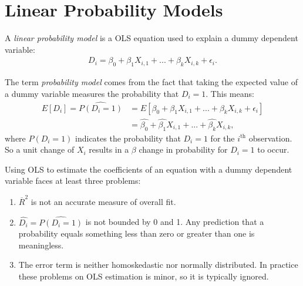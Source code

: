 \documentclass[11pt,twoside,openany]{memoir}
\begin{document}
        \begin{example}
            
        \end{example}
    \section*{Linear Probability Models}
        \begin{definition}
            A \textit{linear probability model} is a OLS equation used to explain a dummy dependent variable:
                \begin{equation*}
                \begin{split}
                    D_i = \beta_0 + \beta_1 X_{i,1} + ... + \beta_k X_{i,k} + \epsilon_i.
                \end{split}
                \end{equation*}
        \end{definition}

        The term \textit{probability model} comes from the fact that taking the expected value of a dummy variable measures the probability that $D_i = 1$. This means:
            \begin{equation*}
            \begin{split}
                E[D_i] = \widehat{P(D_i = 1)}
                & = E[\beta_0 + \beta_1 X_{i,1} + ... + \beta_k X_{i,k} + \epsilon_i] \\
                & = \widehat{\beta_0} + \widehat{\beta_1} X_{i,1} + ... + \widehat{\beta_k} X_{i,k},
            \end{split}
            \end{equation*}
        where $P(D_i = 1)$ indicates the probability that $D_i = 1$ for the $i^\text{th}$ observation. So a unit change of $X_i$ results in a $\beta$ change in probability for $D_i = 1$ to occur.

        Using OLS to estimate the coefficients of an equation with a dummy dependent variable faces at least three problems:
            \begin{enumerate}[label = (\arabic*),itemsep=1pt,topsep=3pt]
                \item $\overline{R}^2$ is not an accurate measure of overall fit.
                \item $\widehat{D_i} = \widehat{P(D_i = 1)}$ is not bounded by 0 and 1. Any prediction that a probability equals something less than zero or greater than one is meaningless.
                \item The error term is neither homoskedastic nor normally distributed. In practice these problems on OLS estimation is minor, so it is typically ignored.
            \end{enumerate}
\end{document}
